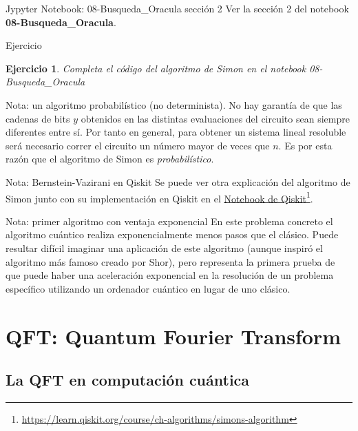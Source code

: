 \documentclass[a4paper,11pt]{book} %
\newtheorem{ejercicio_contador}{Ejercicio}
\newcommand{\Ejercicio}[1]{
		\begin{mybox_gray}{Ejercicio} 
			\begin{ejercicio_contador}
				 #1 
			\end{ejercicio_contador} 
		\end{mybox_gray}
	}
\numberwithin{equation}{chapter}
\begin{document}
	\begin{mybox_orange}{Jypyter Notebook: 08-Busqueda\_Oracula sección 2}
	Ver la sección 2 del notebook \textbf{08-Busqueda\_Oracula}.
	\end{mybox_orange}

	\Ejercicio{Completa el código del algoritmo de Simon en el notebook 08-Busqueda\_Oracula}

	\begin{mybox_blue}{Nota: un algoritmo probabilístico (no determinista).}
	No hay garantía de que las cadenas de bits $y$ obtenidos en las distintas evaluaciones del circuito sean siempre diferentes entre sí. 
	Por tanto en general, para obtener un sistema lineal resoluble será necesario correr el circuito un número mayor de veces que $n$.  
	Es por esta razón que el algoritmo de Simon es \textit{probabilístico}.
	\end{mybox_blue}

	\begin{mybox_blue}{Nota: Bernstein-Vazirani en Qiskit}
	Se puede ver otra explicación del algoritmo de  Simon junto con su implementación en Qiskit en el 
	\href{https://learn.qiskit.org/course/ch-algorithms/simons-algorithm}{Notebook de Qiskit}\footnote{\url{https://learn.qiskit.org/course/ch-algorithms/simons-algorithm}}.
	\end{mybox_blue}
	
	

	\begin{mybox_blue}{Nota: primer algoritmo con ventaja exponencial}
	En este problema concreto el algoritmo cuántico realiza exponencialmente menos pasos que el clásico. Puede resultar difícil imaginar una aplicación de este algoritmo 
	(aunque inspiró el algoritmo más famoso creado por Shor), pero representa la primera prueba de que puede haber una aceleración exponencial en la resolución de un 
	problema específico utilizando un ordenador cuántico en lugar de uno clásico.
	\end{mybox_blue}


	



\chapter{QFT: Quantum Fourier Transform} \label{chapter_QFT}

	\section{La QFT en computación cuántica}
	
\end{document}
